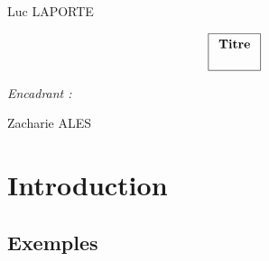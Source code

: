 \documentclass[12pt]{report}
\begin{document}
\pagestyle{fancyplain}
\renewcommand{\chaptermark}[1]{\markboth{\chaptername\ \thechapter. #1}{}}
\renewcommand{\sectionmark}[1]{\markright{\thesection. #1}}
\lhead[]{\fancyplain{}{\bfseries\leftmark}}
\rhead[]{\fancyplain{}{\bfseries\thepage}}
\cfoot{}

\makeatletter
\def\figurename{{\protect\sc \protect\small\bfseries Fig.}}
\def\f@ffrench{\protect\figurename\space{\protect\small\bf \thefigure}\space}
\let\fnum@figure\f@ffrench%
\let\captionORI\caption
\def\caption#1{\captionORI{\rm\small #1}}
\makeatother

\graphicspath{{img/}}

\thispagestyle{empty}
{\Large
\begin{center}
Luc LAPORTE
\vskip1cm


$$\fbox{$
  \begin{array}{c}
  \textbf{Titre}
  \vphantom{\int_\int}
  \end{array}
  $}
$$
\end{center}
\vskip8cm

\begin{flushright}
\textit{Encadrant :}

Zacharie ALES
\end{flushright}
}

\clearpage

\renewcommand{\baselinestretch}{1.30}\small \normalsize

\tableofcontents

\renewcommand{\baselinestretch}{1.18}\small \normalsize


\chapter{Introduction}

\section{Exemples}
\end{document}
